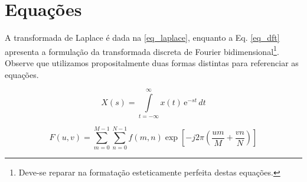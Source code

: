 \begin{apendicesenv}
\begin{figure}[!htb]
{        }\hspace{2ex} %
    \end{figure}

    \section{Equações}
    \label{sec_equacoes}

    A transformada de Laplace é dada na \autoref{eq_laplace}, enquanto a Eq. \ref{eq_dft} apresenta a formulação da transformada discreta de Fourier bidimensional\footnote{Deve-se reparar na formatação esteticamente perfeita destas equações.}.
    Observe que utilizamos propositalmente duas formas distintas para referenciar as equações.

    \begin{equation}
        X(s) = \int\limits_{t = -\infty}^{\infty} x(t) \, \text{e}^{-st} \, dt
        \label{eq_laplace}
    \end{equation}

    \begin{equation}
        F(u, v) = \sum_{m = 0}^{M - 1} \sum_{n = 0}^{N - 1} f(m, n) \exp \left[ -j 2 \pi \left( \frac{u m}{M} + \frac{v n}{N} \right) \right]
        \label{eq_dft}
    \end{equation}


\end{apendicesenv}
